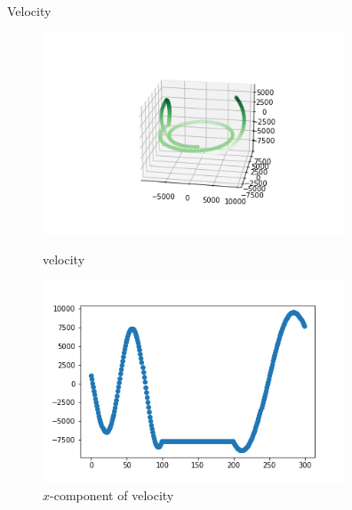 \documentclass[12pt]{article}
\begin{document}
	Velocity
	\begin{figure}[H]
		\begin{multicols}{2}
			\includegraphics[width=\linewidth, height=6cm]{vs2.png} \caption{velocity} \label{vs2} \par
			\includegraphics[width=\linewidth, height=6cm]{vsx2.png} \caption{$x$-component of velocity} \label{vsx2} \par
		\end{multicols}
	\end{figure}
\end{document}
